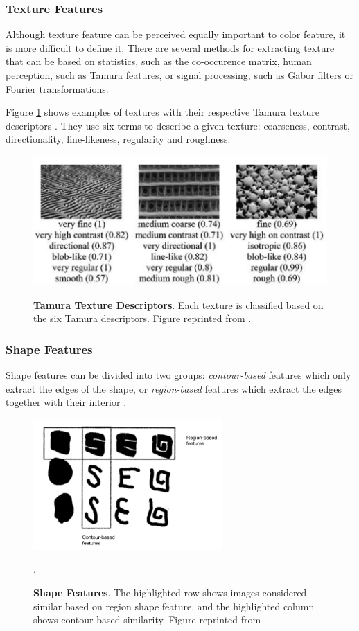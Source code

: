 \documentclass[12pt]{report}
\begin{document}
\subsubsection{Texture Features}
Although texture feature can be perceived equally important to color feature, it is more difficult to define it. There are several methods for extracting texture that can be based on statistics, such as the co-occurence matrix, human perception, such as Tamura features, or signal processing, such as Gabor filters or Fourier transformations.

Figure \ref{fig:texture_feat} shows examples of textures with their respective Tamura texture descriptors \cite{tamura1978textural}. They use six terms to describe a given texture: coarseness, contrast, directionality, line-likeness, regularity and roughness. 

\begin{figure}[h]
\centering
{\includegraphics[width=0.7\linewidth]{02_background/CBIR/texture_features}}
\caption{\label{fig:texture_feat} \textbf{Tamura Texture Descriptors}. Each texture is classified based on the six Tamura descriptors. Figure reprinted from \cite{LIN20032255}.}
\end{figure}


\subsubsection{Shape Features}
Shape features can be divided into two groups: \textit{contour-based} features which only extract the edges of the shape, or \textit{region-based} features which extract the edges together with their interior \cite{zhang2004review}.

\begin{figure}[!h]
\centering
{\includegraphics[height=5cm]{02_background/CBIR/shape_features}}
\caption{\label{fig:shape_feat} \textbf{Shape Features}. The highlighted row shows images considered similar based on region shape feature, and the highlighted column shows contour-based similarity. Figure reprinted from \cite{bober_mpeg-7_2001}}.
\end{figure}
\end{document}
